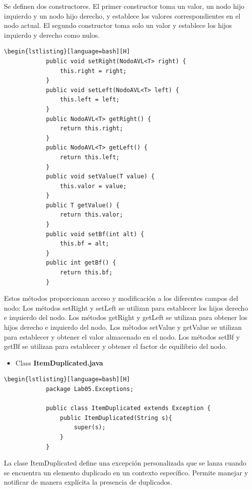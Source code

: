 \documentclass{article}
\begin{document}
Se definen dos constructores. El primer constructor toma un valor, un nodo hijo izquierdo y un nodo hijo derecho, y establece los valores correspondientes en el nodo actual. El segundo constructor toma solo un valor y establece los hijos izquierdo y derecho como nulos.

 \begin{lstlisting}[caption={\textbf{Parte 2: Métodos de acceso y modificación}}]
        \begin{lstlisting}[language=bash][H] 
            public void setRight(NodoAVL<T> right) {
                this.right = right;
            }
            public void setLeft(NodoAVL<T> left) {
                this.left = left;
            }
            public NodoAVL<T> getRight() {
                return this.right;
            }
            public NodoAVL<T> getLeft() {
                return this.left;
            }
            public void setValue(T value) {
                this.valor = value;
            }
            public T getValue() {
                return this.valor;
            }
            public void setBf(int alt) {
                this.bf = alt;
            }
            public int getBf() {
                return this.bf;
            }
         \end{lstlisting}
Estos métodos proporcionan acceso y modificación a los diferentes campos del nodo: Los métodos setRight y setLeft se utilizan para establecer los hijos derecho e izquierdo del nodo. Los métodos getRight y getLeft se utilizan para obtener los hijos derecho e izquierdo del nodo. Los métodos setValue y getValue se utilizan para establecer y obtener el valor almacenado en el nodo. Los métodos setBf y getBf se utilizan para establecer y obtener el factor de equilibrio del nodo.


    \begin{itemize}
        \item Class \textbf{ItemDuplicated.java}
    \end{itemize}
    \begin{lstlisting}[caption={\textbf{Se puede lanzar cuando se encuentra un elemento duplicado en algún contexto específico.}}]
        \begin{lstlisting}[language=bash][H] 
            package Lab05.Exceptions;
            
            public class ItemDuplicated extends Exception {
                public ItemDuplicated(String s){
                    super(s);
                }
            }
         \end{lstlisting}
La clase ItemDuplicated define una excepción personalizada que se lanza cuando se encuentra un elemento duplicado en un contexto específico. Permite manejar y notificar de manera explícita la presencia de duplicados.
\end{document}
